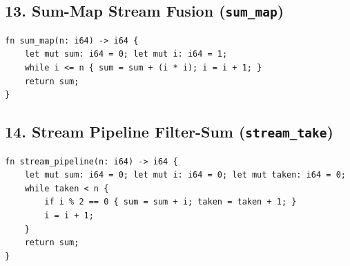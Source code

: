 \subsection{13. Sum-Map Stream Fusion (\texttt{sum\_map})}
\begin{lstlisting}[language=NumLang, caption={NumLang Stream Fusion (1M).}]
fn sum_map(n: i64) -> i64 {
    let mut sum: i64 = 0; let mut i: i64 = 1;
    while i <= n { sum = sum + (i * i); i = i + 1; }
    return sum;
}
\end{lstlisting}

\subsection{14. Stream Pipeline Filter-Sum (\texttt{stream\_take})}
\begin{lstlisting}[language=NumLang, caption={NumLang Stream Filter-Sum.}]
fn stream_pipeline(n: i64) -> i64 {
    let mut sum: i64 = 0; let mut i: i64 = 0; let mut taken: i64 = 0;
    while taken < n {
        if i % 2 == 0 { sum = sum + i; taken = taken + 1; }
        i = i + 1;
    }
    return sum;
}
\end{lstlisting}
